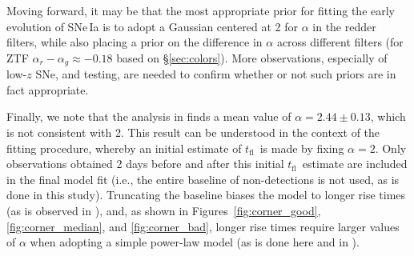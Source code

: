\documentclass[twocolumn]{./aastex63}
\newcommand{\tfl}{$t_\mathrm{fl}$}
\begin{document}
Moving forward, it may be that the most appropriate prior for fitting the
early evolution of SNe\,Ia is to adopt a Gaussian centered at 2 for $\alpha$ in
the redder filters, while also placing a prior on the difference in $\alpha$
across different filters (for ZTF $\alpha_r - \alpha_g \approx -0.18$ based on
\S\ref{sec:colors}). More observations, especially of low-$z$ SNe, and
testing, are needed to confirm whether or not such priors are in fact
appropriate.

Finally, we note that the analysis in \citet{Firth15} finds a mean value of
$\alpha = 2.44 \pm 0.13$, which is not consistent with 2. This result can be
understood in the context of the \citet{Firth15} fitting procedure, whereby an
initial estimate of \tfl\ is made by fixing $\alpha = 2$. Only observations
obtained 2 days before and after this initial \tfl\ estimate are included in
the final model fit (i.e., the entire baseline of non-detections is not used,
as is done in this study). Truncating the baseline biases the model to longer
rise times (as is observed in \citealt{Firth15}), and, as shown in
Figures~\ref{fig:corner_good}, \ref{fig:corner_median}, and
\ref{fig:corner_bad}, longer rise times require larger values of $\alpha$ when
adopting a simple power-law model (as is done here and in \citealt{Firth15}).
\end{document}
